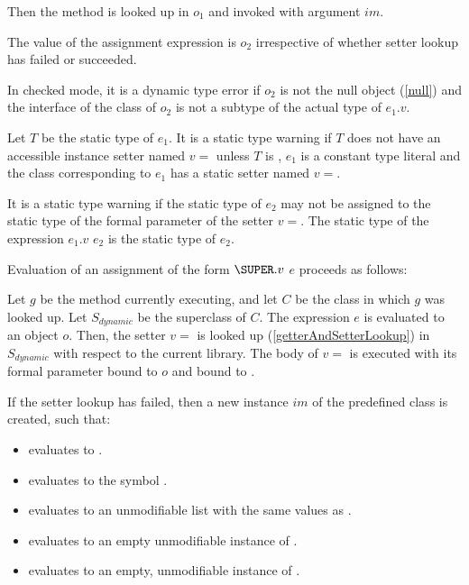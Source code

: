 \documentclass{article}
\begin{document}
\LMHash{}
Then the method  is looked up in $o_1$ and invoked with argument $im$.

%

\LMHash{}
The value of the assignment expression is $o_2$ irrespective of whether setter lookup has failed or succeeded.

\LMHash{}
In checked mode, it is a dynamic type error if $o_2$ is not the null object (\ref{null}) and the interface of the class of $o_2$ is not a subtype of the actual type of $e_1.v$.

\LMHash{}
Let $T$ be the static type of $e_1$.
It is a static type warning if $T$ does not have an accessible instance setter named $v=$ unless $T$ is , $e_1$ is a constant type literal and the class corresponding to $e_1$ has a static setter named $v=$.

\LMHash{}
It is a static type warning if the static type of $e_2$ may not be assigned to the static type of the formal parameter of the setter $v=$.
The static type of the expression $e_1.v$ \code{=} $e_2$ is the static type of $e_2$.

\LMHash{}
Evaluation of an assignment of the form $\SUPER.v$ \code{=} $e$ proceeds as follows:

\LMHash{}
Let $g$ be the method currently executing, and let $C$ be the class in which $g$ was looked up.
Let $S_{dynamic}$ be the superclass of $C$.
The expression $e$ is evaluated to an object $o$.
Then, the setter $v=$ is looked up (\ref{getterAndSetterLookup}) in $S_{dynamic}$ with respect to the current library.
The body of $v=$ is executed with its formal parameter bound to $o$ and \THIS{} bound to \THIS{}.

\LMHash{}
If the setter lookup has failed, then a new instance $im$ of the predefined class  is created, such that:
\begin{itemize}
\item {} evaluates to \code{\TRUE{}}.
\item {} evaluates to the symbol .
\item {} evaluates to an unmodifiable list with the same values as \code{[$o$]}.
\item {} evaluates to an empty unmodifiable instance of .
\item {} evaluates to an empty, unmodifiable instance of
.
\end{itemize}
\end{document}
